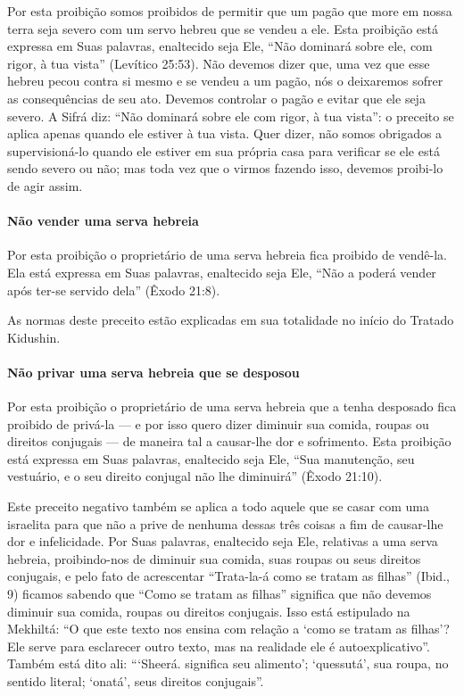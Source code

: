 Por esta proibição somos proibidos de permitir que um pagão que more em
nossa terra seja severo com um servo hebreu que se vendeu a ele. Esta
proibição está expressa em Suas palavras, enaltecido seja Ele, ``Não
dominará sobre ele, com rigor, à tua vista'' (Levítico 25:53). Não
devemos dizer que, uma vez que esse hebreu pecou contra si mesmo e se
vendeu a um pagão, nós o deixaremos sofrer as consequências de seu ato.
Devemos controlar o pagão e evitar que ele seja severo. A Sifrá diz:
``Não dominará sobre ele com rigor, à tua vista'': o preceito se aplica
apenas quando ele estiver à tua vista. Quer dizer, não somos
obrigados a supervisioná-lo quando ele estiver em sua própria casa para
verificar se ele está sendo severo ou não; mas toda vez que o virmos
fazendo isso, devemos proibi-lo de agir assim.

\paragraph{Não vender uma serva hebreia}

Por esta proibição o proprietário de uma serva hebreia fica proibido de
vendê-la. Ela está expressa em Suas palavras, enaltecido seja Ele, ``Não
a poderá vender após ter-se servido dela'' (Êxodo 21:8).

As normas deste preceito estão explicadas em sua totalidade no início
do Tratado Kidushin.

\paragraph{Não privar uma serva hebreia que se desposou}

Por esta proibição o proprietário de uma serva hebreia que a tenha
desposado fica proibido de privá-la --- e por isso quero dizer diminuir
sua comida, roupas ou direitos conjugais --- de maneira tal a
causar-lhe dor e sofrimento. Esta proibição está expressa em Suas
palavras, enaltecido seja Ele, ``Sua manutenção, seu vestuário, e o seu
direito conjugal não lhe diminuirá'' (Êxodo 21:10).

Este preceito negativo também se aplica a todo aquele que se casar com
uma israelita para que não a prive de nenhuma dessas três coisas a fim
de causar-lhe dor e infelicidade. Por Suas palavras, enaltecido seja Ele,
relativas a uma serva hebreia, proibindo-nos de diminuir sua comida,
suas roupas ou seus direitos conjugais, e pelo fato de acrescentar
``Trata-la-á como se tratam as filhas'' (Ibid., 9) ficamos sabendo que
``Como se tratam as filhas'' significa que não devemos diminuir sua
comida, roupas ou direitos conjugais. Isso está estipulado na Mekhiltá:
``O que este texto nos ensina com relação a `como se tratam as filhas'?
Ele serve para esclarecer outro texto, mas na realidade ele é
autoexplicativo''. Também está dito ali: ```Sheerá.
significa seu alimento'; `quessutá', sua roupa, no sentido literal;
`onatá', seus direitos conjugais''.


